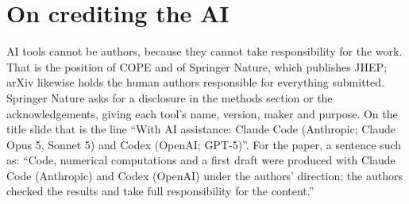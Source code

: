 \documentclass[12pt,a4paper]{article}
\begin{document}
\section*{On crediting the AI}

AI tools cannot be authors, because they cannot take responsibility for the work.
That is the position of COPE and of Springer Nature, which publishes JHEP; arXiv
likewise holds the human authors responsible for everything submitted. Springer
Nature asks for a disclosure in the methods section or the acknowledgements, giving
each tool's name, version, maker and purpose. On the
title slide that is the line ``With AI assistance: Claude Code (Anthropic; Claude
Opus 5, Sonnet 5) and Codex (OpenAI; GPT-5)''. For the paper, a sentence such as:
``Code, numerical computations and a first draft were produced with Claude Code
(Anthropic) and Codex (OpenAI) under the authors' direction; the authors checked
the results and take full responsibility for the content.''
\end{document}
